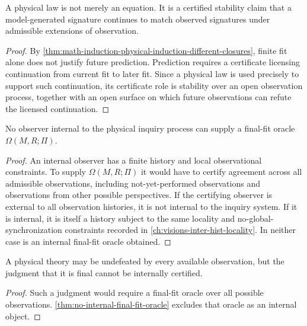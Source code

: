 \begin{corollary}
\label{cor:physical-law-as-stability-certificate}
A physical law is not merely an equation. It is a certified stability claim that a model-generated signature continues to match observed signatures under admissible extensions of observation.
\end{corollary}

\begin{proof}
By \autoref{thm:math-induction-physical-induction-different-closures}, finite fit alone does not justify future prediction. Prediction requires a certificate licensing continuation from current fit to later fit. Since a physical law is used precisely to support such continuation, its certificate role is stability over an open observation process, together with an open surface on which future observations can refute the licensed continuation.
\end{proof}

\begin{theorem}
\label{thm:no-internal-final-fit-oracle}
No observer internal to the physical inquiry process can supply a final-fit oracle $\Omega(M,R;\Pi)$.
\end{theorem}

\begin{proof}
An internal observer has a finite history and local observational constraints. To supply $\Omega(M,R;\Pi)$ it would have to certify agreement across all admissible observations, including not-yet-performed observations and observations from other possible perspectives. If the certifying observer is external to all observation histories, it is not internal to the inquiry system. If it is internal, it is itself a history subject to the same locality and no-global-synchronization constraints recorded in \autoref{ch:visions-inter-hist-locality}. In neither case is an internal final-fit oracle obtained.
\end{proof}

\begin{corollary}
\label{cor:final-theory-not-internal-certificate}
A physical theory may be undefeated by every available observation, but the judgment that it is final cannot be internally certified.
\end{corollary}

\begin{proof}
Such a judgment would require a final-fit oracle over all possible observations. \autoref{thm:no-internal-final-fit-oracle} excludes that oracle as an internal object.
\end{proof}

